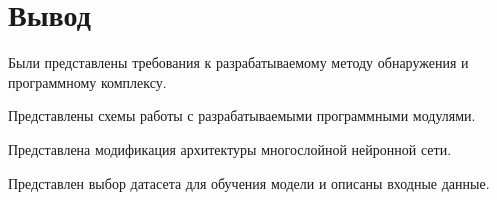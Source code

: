 \section{Вывод}
Были представлены требования к разрабатываемому методу обнаружения и программному комплексу.

Представлены схемы работы с разрабатываемыми программными модулями. 

Представлена модификация архитектуры многослойной нейронной сети.

Представлен выбор датасета для обучения модели и описаны входные данные.












